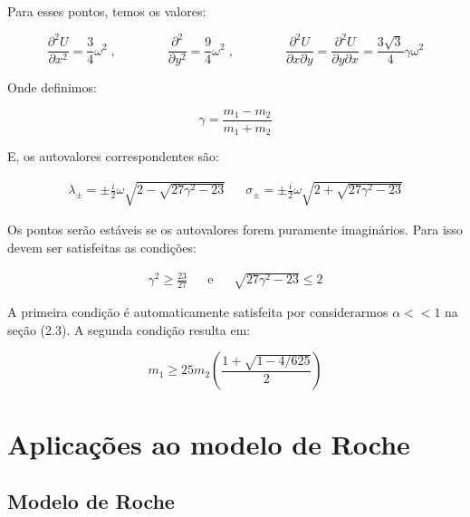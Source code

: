 Para esses pontos, temos os valores:

\begin{equation}
\dfrac{\partial ^2U}{\partial x^2} = \dfrac{3}{4}\omega^2 \;, \qquad \qquad \dfrac{\partial ^2}{\partial y^2} = \dfrac{9}{4}\omega^2 \;, \qquad \qquad \dfrac{\partial ^2U}{\partial x\partial y} = \dfrac{\partial ^2U}{\partial y\partial x} = \dfrac{3\sqrt{3}}{4}\gamma \omega^2
\end{equation}

\vspace{20px}

Onde definimos: 

\vspace{-35px}

\begin{equation*}
\!\!\!\!\!\!\!\!\!\!\!\!\!\!\!\!\!\!\!\!\!\!\!\!\!\!\!\!\!\!\!\!\!\!\!\!\!\!\!\!\!\!\!\!\!\!\!\!\!\!\!\!\!\!\!\!\!\!\!\!\!\!\!\!\!\!\!\!\!\!\!\!\!\!\!\!\!\!\!\!\!\!\!\!\!\!\!\!\!\!\!\!\!\!\!\!\!\!\!\!\!\!\!\!\!\!\!\!\!\!\!\!\!\!\!\!\!\!\!\!\!\!\!\!\!\! \gamma = \dfrac{m_1-m_2}{m_1+m_2}
\end{equation*}

E, os autovalores correspondentes são:

\begin{align}
\lambda_{\pm} = \pm \frac{i}{2} \omega \sqrt{2-\sqrt{27\gamma^2-23}} && \sigma_{\pm} = \pm \frac{i}{2} \omega \sqrt{2 +\sqrt{27\gamma^2 - 23}}
\end{align}

Os pontos serão estáveis se os autovalores forem puramente imaginários. Para isso devem ser satisfeitas as condições:

\begin{align}
\gamma^2 \geq \frac{23}{27} && \text{e} && \sqrt{27\gamma^2 -23} \leq 2
\end{align}

A primeira condição é automaticamente satisfeita por considerarmos $\alpha << 1$ na seção (2.3). A segunda condição resulta em:

\begin{equation}
m_1 \geq 25m_2\left(\dfrac{1+\sqrt{1-4/625}}{2}\right)
\end{equation}

\section{Aplicações ao modelo de Roche}

\subsection{Modelo de Roche}

